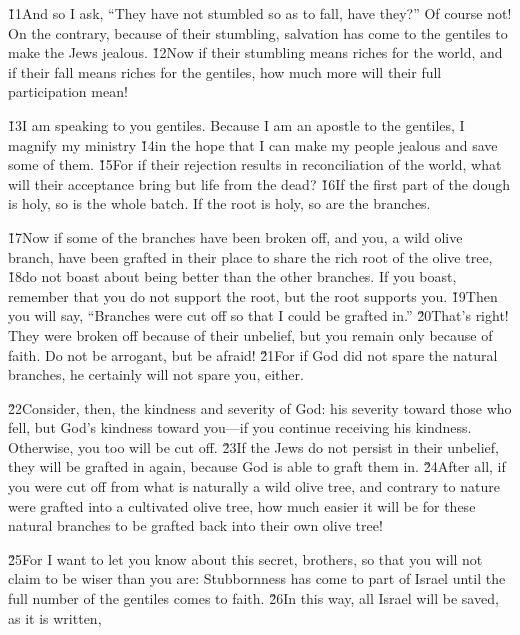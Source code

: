 \v{11}And so I ask, ``They have not stumbled so as to fall, have they?'' Of course not! On the contrary, because of their stumbling, salvation has come to the gentiles to make the Jews jealous. \v{12}Now if their stumbling means riches for the world, and if their fall means riches for the gentiles, how much more will their full participation mean!

\v{13}I am speaking to you gentiles. Because I am an apostle to the gentiles, I magnify my ministry \v{14}in the hope that I can make my people jealous and save some of them. \v{15}For if their rejection results in reconciliation of the world, what will their acceptance bring but life from the dead? \v{16}If the first part of the dough is holy, so is the whole batch. If the root is holy, so are the branches.

\v{17}Now if some of the branches have been broken off, and you, a wild olive branch, have been grafted in their place to share the rich root of the olive tree, \v{18}do not boast about being better than the other branches. If you boast, remember that you do not support the root, but the root supports you. \v{19}Then you will say, ``Branches were cut off so that I could be grafted in.'' \v{20}That's right! They were broken off because of their unbelief, but you remain only because of faith. Do not be arrogant, but be afraid! \v{21}For if God did not spare the natural branches, he certainly will not spare you, either.

\v{22}Consider, then, the kindness and severity of God: his severity toward those who fell, but God's kindness toward you---if you continue receiving his kindness. Otherwise, you too will be cut off. \v{23}If the Jews do not persist in their unbelief, they will be grafted in again, because God is able to graft them in. \v{24}After all, if you were cut off from what is naturally a wild olive tree, and contrary to nature were grafted into a cultivated olive tree, how much easier it will be for these natural branches to be grafted back into their own olive tree!

\v{25}For I want to let you know about this secret, brothers, so that you will not claim to be wiser than you are: Stubbornness has come to part of Israel until the full number of the gentiles comes to faith. \v{26}In this way, all Israel will be saved, as it is written,

